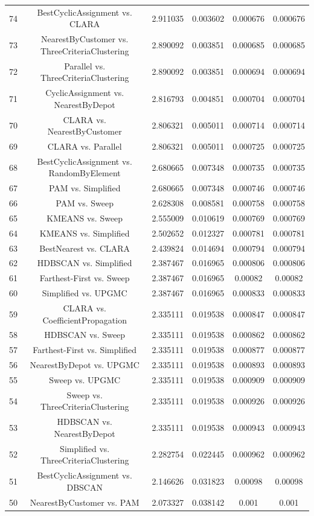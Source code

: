 \documentclass[a4paper,10pt]{article}
\begin{document}
\begin{landscape}
\begin{table}[!htp]
\begin{tabular}{cccccc}
74&BestCyclicAssignment vs. CLARA&2.911035&0.003602&0.000676&0.000676\\
73&NearestByCustomer vs. ThreeCriteriaClustering&2.890092&0.003851&0.000685&0.000685\\
72&Parallel vs. ThreeCriteriaClustering&2.890092&0.003851&0.000694&0.000694\\
71&CyclicAssignment vs. NearestByDepot&2.816793&0.004851&0.000704&0.000704\\
70&CLARA vs. NearestByCustomer&2.806321&0.005011&0.000714&0.000714\\
69&CLARA vs. Parallel&2.806321&0.005011&0.000725&0.000725\\
68&BestCyclicAssignment vs. RandomByElement&2.680665&0.007348&0.000735&0.000735\\
67&PAM vs. Simplified&2.680665&0.007348&0.000746&0.000746\\
66&PAM vs. Sweep&2.628308&0.008581&0.000758&0.000758\\
65&KMEANS vs. Sweep&2.555009&0.010619&0.000769&0.000769\\
64&KMEANS vs. Simplified&2.502652&0.012327&0.000781&0.000781\\
63&BestNearest vs. CLARA&2.439824&0.014694&0.000794&0.000794\\
62&HDBSCAN vs. Simplified&2.387467&0.016965&0.000806&0.000806\\
61&Farthest-First vs. Sweep&2.387467&0.016965&0.00082&0.00082\\
60&Simplified vs. UPGMC&2.387467&0.016965&0.000833&0.000833\\
59&CLARA vs. CoefficientPropagation&2.335111&0.019538&0.000847&0.000847\\
58&HDBSCAN vs. Sweep&2.335111&0.019538&0.000862&0.000862\\
57&Farthest-First vs. Simplified&2.335111&0.019538&0.000877&0.000877\\
56&NearestByDepot vs. UPGMC&2.335111&0.019538&0.000893&0.000893\\
55&Sweep vs. UPGMC&2.335111&0.019538&0.000909&0.000909\\
54&Sweep vs. ThreeCriteriaClustering&2.335111&0.019538&0.000926&0.000926\\
53&HDBSCAN vs. NearestByDepot&2.335111&0.019538&0.000943&0.000943\\
52&Simplified vs. ThreeCriteriaClustering&2.282754&0.022445&0.000962&0.000962\\
51&BestCyclicAssignment vs. DBSCAN&2.146626&0.031823&0.00098&0.00098\\
50&NearestByCustomer vs. PAM&2.073327&0.038142&0.001&0.001\\

\end{tabular}
\end{table}
\end{landscape}
\end{document}
